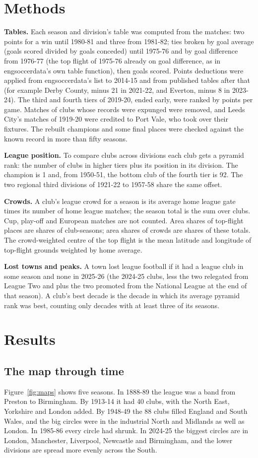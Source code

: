 \documentclass[11pt,a4paper]{article}
\begin{document}
\section{Methods}
\textbf{Tables.} Each season and division's table was computed from the matches: two points for a win until 1980-81 and three from 1981-82; ties broken by goal average (goals scored divided by goals conceded) until 1975-76 and by goal difference from 1976-77 (the top flight of 1975-76 already on goal difference, as in engsoccerdata's own table function), then goals scored. Points deductions were applied from engsoccerdata's list to 2014-15 and from published tables after that (for example Derby County, minus 21 in 2021-22, and Everton, minus 8 in 2023-24). The third and fourth tiers of 2019-20, ended early, were ranked by points per game. Matches of clubs whose records were expunged were removed, and Leeds City's matches of 1919-20 were credited to Port Vale, who took over their fixtures. The rebuilt champions and some final places were checked against the known record in more than fifty seasons.

\textbf{League position.} To compare clubs across divisions each club gets a pyramid rank: the number of clubs in higher tiers plus its position in its division. The champion is 1 and, from 1950-51, the bottom club of the fourth tier is 92. The two regional third divisions of 1921-22 to 1957-58 share the same offset.

\textbf{Crowds.} A club's league crowd for a season is its average home league gate times its number of home league matches; the season total is the sum over clubs. Cup, play-off and European matches are not counted. Area shares of top-flight places are shares of club-seasons; area shares of crowds are shares of these totals. The crowd-weighted centre of the top flight is the mean latitude and longitude of top-flight grounds weighted by home average.

\textbf{Lost towns and peaks.} A town lost league football if it had a league club in some season and none in 2025-26 (the 2024-25 clubs, less the two relegated from League Two and plus the two promoted from the National League at the end of that season). A club's best decade is the decade in which its average pyramid rank was best, counting only decades with at least three of its seasons.

\section{Results}
\subsection{The map through time}
Figure~\ref{fig:maps} shows five seasons. In 1888-89 the league was a band from Preston to Birmingham. By 1913-14 it had 40 clubs, with the North East, Yorkshire and London added. By 1948-49 the 88 clubs filled England and South Wales, and the big circles were in the industrial North and Midlands as well as London. In 1985-86 every circle had shrunk. In 2024-25 the biggest circles are in London, Manchester, Liverpool, Newcastle and Birmingham, and the lower divisions are spread more evenly across the South.
\end{document}
